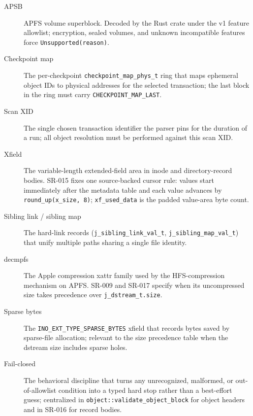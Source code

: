 \begin{description}
  \item[APSB] APFS volume superblock. Decoded by the Rust crate under the v1
  feature allowlist; encryption, sealed volumes, and unknown incompatible
  features force \texttt{Unsupported(reason)}.
  \item[Checkpoint map] The per-checkpoint
  \texttt{checkpoint\_map\_phys\_t} ring that maps ephemeral object IDs to
  physical addresses for the selected transaction; the last block in the ring
  must carry \texttt{CHECKPOINT\_MAP\_LAST}.
  \item[Scan XID] The single chosen transaction identifier the parser pins for
  the duration of a run; all object resolution must be performed against this
  scan XID.
  \item[Xfield] The variable-length extended-field area in inode and
  directory-record bodies. SR-015 fixes one source-backed cursor rule:
  values start immediately after the metadata table and each value advances by
  \texttt{round\_up(x\_size, 8)}; \texttt{xf\_used\_data} is the padded
  value-area byte count.
  \item[Sibling link / sibling map] The hard-link records
  (\texttt{j\_sibling\_link\_val\_t}, \texttt{j\_sibling\_map\_val\_t}) that
  unify multiple paths sharing a single file identity.
  \item[decmpfs] The Apple compression xattr family used by the
  HFS-compression mechanism on APFS. SR-009 and SR-017 specify when its
  uncompressed size takes precedence over \texttt{j\_dstream\_t.size}.
  \item[Sparse bytes] The \texttt{INO\_EXT\_TYPE\_SPARSE\_BYTES} xfield that
  records bytes saved by sparse-file allocation; relevant to the size
  precedence table when the dstream size includes sparse holes.
  \item[Fail-closed] The behavioral discipline that turns any unrecognized,
  malformed, or out-of-allowlist condition into a typed hard stop rather than
  a best-effort guess; centralized in
  \texttt{object::validate\_object\_block} for object headers and in SR-016
  for record bodies.
\end{description}
